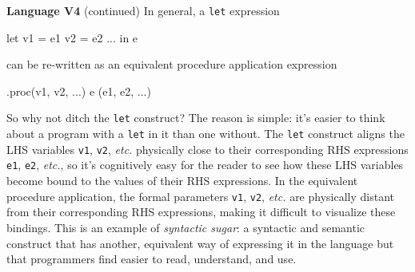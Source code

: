 \begin{minipage}[t]{\sw}
\slidenumber
\LARGE
{\bf Language V4} (continued)\exx
In general, a \verb'let' expression
{\Large
\begin{qv}
let
  v1 = e1
  v2 = e2
  ...
in
  e
\end{qv}
}
can be re-written as an equivalent procedure application expression
{\Large
\begin{qv}
.proc(v1, v2, ...) e (e1, e2, ...)
\end{qv}
}
So why not ditch the \verb'let' construct?
The reason is simple:
it's easier to think about a program with a \verb'let' in it
than one without.
The \verb'let' construct aligns
the LHS variables \verb'v1', \verb'v2', {\em etc.}
physically close to their corresponding RHS expressions
\verb'e1', \verb'e2', {\em etc.},
so it's cognitively easy for the reader
to see how these LHS variables become bound
to the values of their RHS expressions.
In the equivalent procedure application,
the formal parameters \verb'v1', \verb'v2', {\em etc.}
are physically distant from their corresponding RHS expressions,
making it difficult to visualize these bindings.\exx
This is an example of {\em syntactic sugar}:
a syntactic and semantic construct
that has another, equivalent way of expressing it in the language
but that programmers find easier to read, understand, and use.
\end{minipage}
\clearpage
